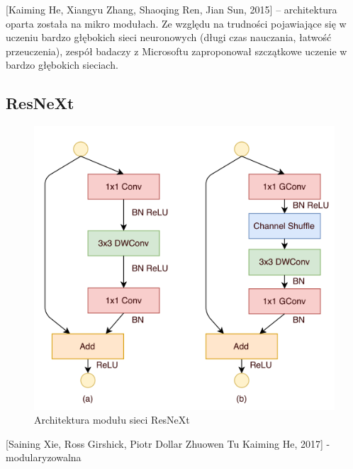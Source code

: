 \documentclass[12pt,a4paper,twoside,titlepage,openright]{book}
\begin{document}
[Kaiming He, Xiangyu Zhang, Shaoqing Ren, Jian Sun, 2015] -- architektura oparta została na mikro modułach. Ze względu na trudności pojawiające się w uczeniu bardzo głębokich sieci neuronowych (długi czas nauczania, łatwość przeuczenia), zespół badaczy z Microsoftu zaproponował szczątkowe uczenie w bardzo głębokich sieciach. 

\cite{DBLP:journals/corr/HeZRS15}


\subsection{ResNeXt}
\begin{figure}[h]
	\centering
			\includegraphics[resolution=100, scale=0.9]{ResNeXt.png}
		\caption{Architektura modułu sieci ResNeXt}
\end{figure}
\cite{DBLP:journals/corr/XieGDTH16}

[Saining Xie, Ross Girshick, Piotr Dollar Zhuowen Tu Kaiming He, 2017] - modularyzowalna 
\cite{DBLP:journals/corr/abs-1805-08700}
\end{document}
